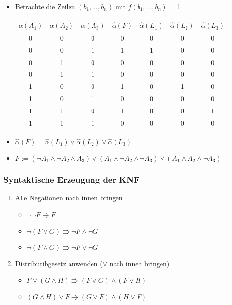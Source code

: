 \documentclass{scrartcl}
\begin{document}
\begin{itemize}
\begin{itemize}
		\item Betrachte die Zeilen $(b_1, \ldots, b_n)$ mit $f(b_1, \ldots, b_n)$ = 1 \\
		\begin{tabular}{|c|c|c|c|c|c|c|}
			\hline 
			$\alpha(A_1)$ & $\alpha(A_2)$ & $\alpha(A_3)$ & $\widehat{\alpha}(F)$ & $\widehat{\alpha}(L_1)$ & $\widehat{\alpha}(L_2)$ & $\widehat{\alpha}(L_3)$ \\ 
			\hline 
			0 & 0 & 0 & 0 & 0 & 0 & 0 \\ 
			\hline 
			0 & 0 & 1 & 1 & 1 & 0 & 0 \\ 
			\hline 
			0 & 1 & 0 & 0 & 0 & 0 & 0 \\ 
			\hline 
			0 & 1 & 1 & 0 & 0 & 0 & 0 \\ 
			\hline 
			1 & 0 & 0 & 1 & 0 & 1 & 0 \\ 
			\hline 
			1 & 0 & 1 & 0 & 0 & 0 & 0 \\ 
			\hline 
			1 & 1 & 0 & 1 & 0 & 0 & 1 \\ 
			\hline 
			1 & 1 & 1 & 0 & 0 & 0 & 0 \\ 
			\hline 
		\end{tabular}
		\item $\widehat{\alpha}(F) = \widehat{\alpha}(L_1) \vee \widehat{\alpha}(L_2) \vee \widehat{\alpha}(L_3)$
		\item $F := (\neg A_1 \wedge \neg A_2 \wedge A_3) \vee (A_1 \wedge \neg A_2 \wedge \neg A_3) \vee (A_1 \wedge A_2 \wedge \neg A_3)$
	\end{itemize}
\end{itemize}

\subsubsection{Syntaktische Erzeugung der KNF}

\begin{enumerate}
	\item Alle Negationen nach innen bringen
	\begin{itemize}
		\item $\neg \neg F \Rrightarrow F$
		\item $\neg (F \vee G) \Rrightarrow \neg F \wedge \neg G$
		\item $\neg (F \wedge G) \Rrightarrow \neg F \vee \neg G$
	\end{itemize}
	\item Distributibgesetz anwenden ($\vee$ nach innen bringen)
	\begin{itemize}
		\item $F \vee (G \wedge H) \Rrightarrow (F \vee G) \wedge (F \vee H)$
		\item $(G \wedge H) \vee F \Rrightarrow (G \vee F) \wedge (H \vee F)$
	\end{itemize}
\end{enumerate}
\end{document}
